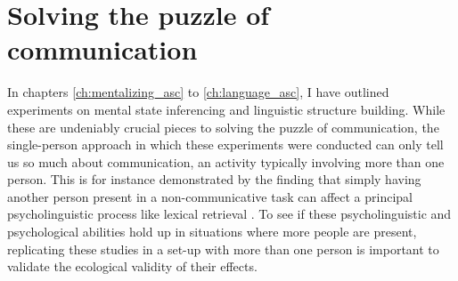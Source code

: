 \section{Solving the puzzle of communication}

In chapters \ref{ch:mentalizing_asc} to \ref{ch:language_asc}, I have outlined experiments on mental state inferencing and linguistic structure building. While these are undeniably crucial pieces to solving the puzzle of communication, the single-person approach in which these experiments were conducted can only tell us so much about communication, an activity typically involving more than one person. This is for instance demonstrated by the finding that simply having another person present in a non-communicative task can affect a principal psycholinguistic process like lexical retrieval \citep{kuhlen2017having}. To see if these psycholinguistic and psychological abilities hold up in situations where more people are present, replicating these studies in a set-up with more than one person is important to validate the ecological validity of their effects.

